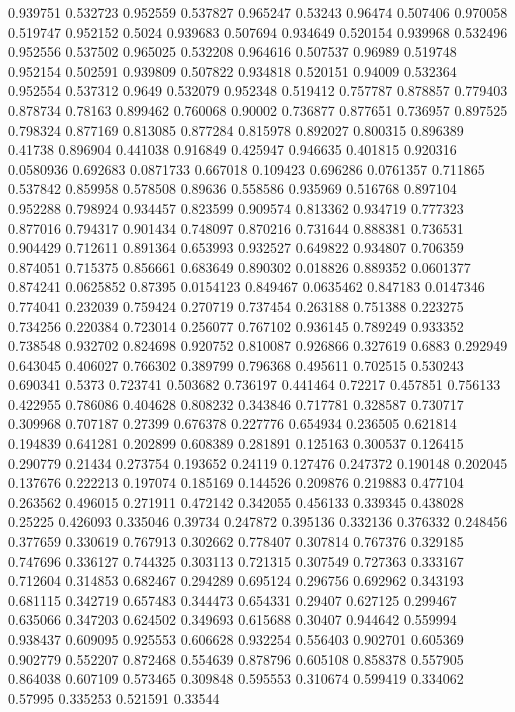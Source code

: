 0.939751 0.532723
0.952559 0.537827
0.965247 0.53243
0.96474 0.507406
0.970058 0.519747
0.952152 0.5024
0.939683 0.507694
0.934649 0.520154
0.939968 0.532496
0.952556 0.537502
0.965025 0.532208
0.964616 0.507537
0.96989 0.519748
0.952154 0.502591
0.939809 0.507822
0.934818 0.520151
0.94009 0.532364
0.952554 0.537312
0.9649 0.532079
0.952348 0.519412
0.757787 0.878857
0.779403 0.878734
0.78163 0.899462
0.760068 0.90002
0.736877 0.877651
0.736957 0.897525
0.798324 0.877169
0.813085 0.877284
0.815978 0.892027
0.800315 0.896389
0.41738 0.896904
0.441038 0.916849
0.425947 0.946635
0.401815 0.920316
0.0580936 0.692683
0.0871733 0.667018
0.109423 0.696286
0.0761357 0.711865
0.537842 0.859958
0.578508 0.89636
0.558586 0.935969
0.516768 0.897104
0.952288 0.798924
0.934457 0.823599
0.909574 0.813362
0.934719 0.777323
0.877016 0.794317
0.901434 0.748097
0.870216 0.731644
0.888381 0.736531
0.904429 0.712611
0.891364 0.653993
0.932527 0.649822
0.934807 0.706359
0.874051 0.715375
0.856661 0.683649
0.890302 0.018826
0.889352 0.0601377
0.874241 0.0625852
0.87395 0.0154123
0.849467 0.0635462
0.847183 0.0147346
0.774041 0.232039
0.759424 0.270719
0.737454 0.263188
0.751388 0.223275
0.734256 0.220384
0.723014 0.256077
0.767102 0.936145
0.789249 0.933352
0.738548 0.932702
0.824698 0.920752
0.810087 0.926866
0.327619 0.6883
0.292949 0.643045
0.406027 0.766302
0.389799 0.796368
0.495611 0.702515
0.530243 0.690341
0.5373 0.723741
0.503682 0.736197
0.441464 0.72217
0.457851 0.756133
0.422955 0.786086
0.404628 0.808232
0.343846 0.717781
0.328587 0.730717
0.309968 0.707187
0.27399 0.676378
0.227776 0.654934
0.236505 0.621814
0.194839 0.641281
0.202899 0.608389
0.281891 0.125163
0.300537 0.126415
0.290779 0.21434
0.273754 0.193652
0.24119 0.127476
0.247372 0.190148
0.202045 0.137676
0.222213 0.197074
0.185169 0.144526
0.209876 0.219883
0.477104 0.263562
0.496015 0.271911
0.472142 0.342055
0.456133 0.339345
0.438028 0.25225
0.426093 0.335046
0.39734 0.247872
0.395136 0.332136
0.376332 0.248456
0.377659 0.330619
0.767913 0.302662
0.778407 0.307814
0.767376 0.329185
0.747696 0.336127
0.744325 0.303113
0.721315 0.307549
0.727363 0.333167
0.712604 0.314853
0.682467 0.294289
0.695124 0.296756
0.692962 0.343193
0.681115 0.342719
0.657483 0.344473
0.654331 0.29407
0.627125 0.299467
0.635066 0.347203
0.624502 0.349693
0.615688 0.30407
0.944642 0.559994
0.938437 0.609095
0.925553 0.606628
0.932254 0.556403
0.902701 0.605369
0.902779 0.552207
0.872468 0.554639
0.878796 0.605108
0.858378 0.557905
0.864038 0.607109
0.573465 0.309848
0.595553 0.310674
0.599419 0.334062
0.57995 0.335253
0.521591 0.33544

